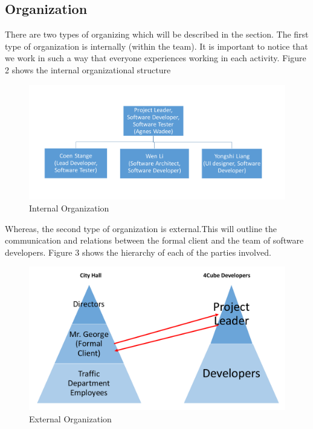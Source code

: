 \documentclass[a4paper,11pt]{article}
\begin{document}
\subsection{Organization}
There are two types of organizing which will be described in the section. The first type of organization is internally (within the team). It is important to notice that we work in such a way that everyone experiences working in each activity. Figure 2 shows the internal organizational structure\\ 
 \begin{figure}[h]
 	\centering
 	\includegraphics[width=\textwidth]{figures/organization1.pdf}
 	\caption{Internal Organization}
 	\label{fig:Org}
 \end{figure}
 
 
  Whereas, the second type of organization is external.This will outline the communication and relations between the formal client and the team of software developers. Figure 3 shows the hierarchy of each of the parties involved.
 \begin{figure}[h]
 	\centering
 	\includegraphics[width=\textwidth]{figures/organization2.pdf}
 	\caption{External Organization}
 	\label{fig:Org2}
 \end{figure}
      	
    
\end{document}
